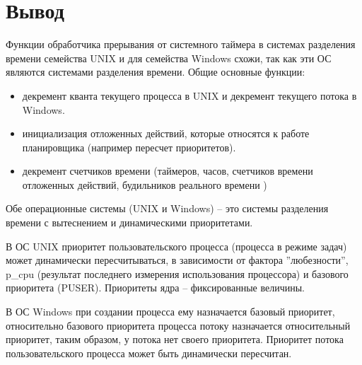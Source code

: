 \chapter{Вывод}
Функции обработчика прерывания от системного таймера в системах разделения времени семейства UNIX и для семейства Windows схожи, так как эти ОС являются системами разделения времени. Общие основные функции:
\begin{itemize}
	\item декремент кванта текущего процесса в UNIX и декремент текущего потока в Windows.
	\item инициализация отложенных действий, которые относятся к работе планировщика (например пересчет приоритетов).
	\item декремент счетчиков времени (таймеров, часов, счетчиков времени отложенных действий, будильников реального времени ) 
\end{itemize}

Обе операционные системы (UNIX и Windows) -- это системы разделения времени с вытеснением и динамическими приоритетами.

В ОС UNIX приоритет пользовательского процесса (процесса в режиме задач) может динамически пересчитываться, в зависимости от фактора ''любезности'', p\_cpu (результат последнего измерения использования процессора) и базового приоритета (PUSER). Приоритеты ядра -- фиксированные величины.

В ОС Windows при создании процесса ему назначается базовый приоритет, относительно базового приоритета процесса потоку назначается относительный приоритет, таким образом, у потока нет своего приоритета. Приоритет потока пользовательского процесса может быть динамически пересчитан.








